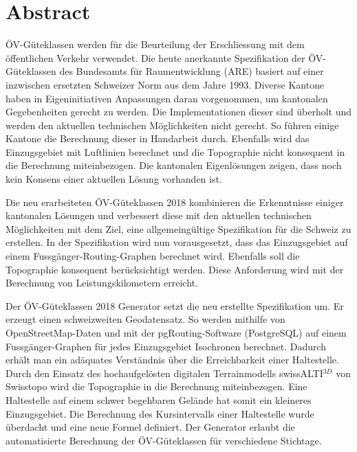 
\chapter*{Abstract}
ÖV-Güteklassen werden für die Beurteilung der Erschliessung mit dem öffentlichen Verkehr verwendet.
Die heute anerkannte Spezifikation der ÖV-Güteklassen des Bundesamts für Raumentwicklung (ARE)  basiert auf einer inzwischen ersetzten Schweizer Norm aus dem Jahre 1993.
Diverse Kantone haben in Eigeninitiativen Anpassungen daran vorgenommen, um kantonalen Gegebenheiten gerecht zu werden.
Die Implementationen dieser sind überholt und werden den aktuellen technischen Möglichkeiten nicht gerecht.
So führen einige Kantone die Berechnung dieser in Handarbeit durch.
Ebenfalls wird das Einzugsgebiet mit Luftlinien berechnet und die Topographie nicht konsequent in die Berechnung miteinbezogen.
Die kantonalen Eigenlösungen zeigen, dass noch kein Konsens einer aktuellen Lösung vorhanden ist.

Die neu erarbeiteten ÖV-Güteklassen 2018 kombinieren die Erkenntnisse einiger kantonalen Lösungen und verbessert diese mit den aktuellen technischen Möglichkeiten mit dem Ziel, eine allgemeingültige Spezifikation für die Schweiz zu erstellen.
In der Spezifikation wird nun vorausgesetzt, dass das Einzugsgebiet auf einem Fussgänger-Routing-Graphen berechnet wird.
Ebenfalls soll die Topographie konsequent berücksichtigt werden.
Diese Anforderung wird mit der Berechnung von Leistungskilometern erreicht.

Der ÖV-Güteklassen 2018 Generator setzt die neu erstellte Spezifikation um.
Er erzeugt einen schweizweiten Geodatensatz.
So werden mithilfe von OpenStreetMap-Daten und mit der pgRouting-Software (PostgreSQL) auf einem Fussgänger-Graphen für jedes Einzugsgebiet Isochronen berechnet.
Dadurch erhält man ein adäquates Verständnis über die Erreichbarkeit einer Haltestelle.
Durch den Einsatz des hochaufgelösten digitalen Terrainmodells swissALTI$^{3D}$ von Swisstopo wird die Topographie in die Berechnung miteinbezogen.
Eine Haltestelle auf einem schwer begehbaren Gelände hat somit ein kleineres Einzugsgebiet.
Die Berechnung des Kursintervalls einer Haltestelle wurde überdacht und eine neue Formel definiert.
Der Generator erlaubt die automatisierte Berechnung der ÖV-Güteklassen für verschiedene Stichtage.

